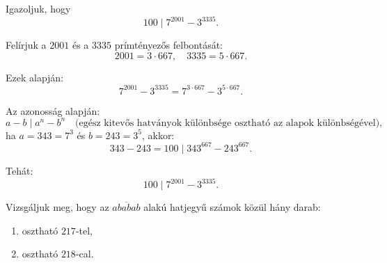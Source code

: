 \vspace{0.5cm}
 
\begin{solution}
Igazoljuk, hogy 
\[
100\mid7^{2001}-3^{3335}.
\]

Felírjuk a $2001$ és a $3335$ prímtényezős felbontását: 
\[
2001=3\cdot667,\quad3335=5\cdot667.
\]

Ezek alapján: 
\[
7^{2001}-3^{3335}=7^{3\cdot667}-3^{5\cdot667}.
\]

Az azonosság alapján: 
\[
a-b\mid a^{n}-b^{n}\quad\text{(egész kitevős hatványok különbsége osztható az alapok különbségével)},
\]
ha $a=343=7^{3}$ és $b=243=3^{5}$, akkor: 
\[
343-243=100\mid343^{667}-243^{667}.
\]

Tehát: 
\[
100\mid7^{2001}-3^{3335}.
\]
\end{solution}
\vspace{0.5cm}
 
\begin{extraproblem}
Vizsgáljuk meg, hogy az $\overline{ababab}$ alakú hatjegyű számok
közül hány darab:
\begin{enumerate}
\item osztható $217$-tel, 
\item osztható $218$-cal. 
\end{enumerate}
\end{extraproblem}

\vspace{0.5cm}
 
